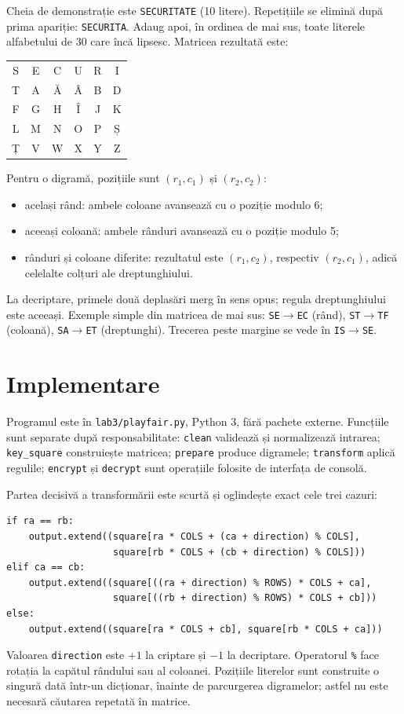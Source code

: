 \documentclass[12pt,a4paper]{article}
\newcommand{\file}[1]{\texttt{#1}}
\begin{document}
Cheia de demonstrație este \texttt{SECURITATE} (10 litere). Repetițiile se elimină
după prima apariție: \texttt{SECURITA}. Adaug apoi, în ordinea de mai sus, toate
literele alfabetului de 30 care încă lipsesc. Matricea rezultată este:

\begin{center}
\renewcommand{\arraystretch}{1.3}
\begin{tabular}{cccccc}
\toprule
S&E&C&U&R&I\\
T&A&Ă&Â&B&D\\
F&G&H&Î&J&K\\
L&M&N&O&P&Ș\\
Ț&V&W&X&Y&Z\\
\bottomrule
\end{tabular}
\end{center}

Pentru o digramă, pozițiile sunt $(r_1,c_1)$ și $(r_2,c_2)$:
\begin{itemize}
\item același rând: ambele coloane avansează cu o poziție modulo 6;
\item aceeași coloană: ambele rânduri avansează cu o poziție modulo 5;
\item rânduri și coloane diferite: rezultatul este $(r_1,c_2)$, respectiv
  $(r_2,c_1)$, adică celelalte colțuri ale dreptunghiului.
\end{itemize}
La decriptare, primele două deplasări merg în sens opus; regula dreptunghiului
este aceeași. Exemple simple din matricea de mai sus: \texttt{SE}$\to$\texttt{EC}
(rând), \texttt{ST}$\to$\texttt{TF} (coloană), \texttt{SA}$\to$\texttt{ET}
(dreptunghi). Trecerea peste margine se vede în \texttt{IS}$\to$\texttt{SE}.

\section{Implementare}

Programul este în \file{lab3/playfair.py}, Python 3, fără pachete externe.
Funcțiile sunt separate după responsabilitate: \file{clean} validează și
normalizează intrarea; \file{key\_square} construiește matricea;
\file{prepare} produce digramele; \file{transform} aplică regulile;
\file{encrypt} și \file{decrypt} sunt operațiile folosite de interfața de consolă.

Partea decisivă a transformării este scurtă și oglindește exact cele trei cazuri:
\begin{lstlisting}
if ra == rb:
    output.extend((square[ra * COLS + (ca + direction) % COLS],
                   square[rb * COLS + (cb + direction) % COLS]))
elif ca == cb:
    output.extend((square[((ra + direction) % ROWS) * COLS + ca],
                   square[((rb + direction) % ROWS) * COLS + cb]))
else:
    output.extend((square[ra * COLS + cb], square[rb * COLS + ca]))
\end{lstlisting}
Valoarea \file{direction} este $+1$ la criptare și $-1$ la decriptare. Operatorul
\file{\%} face rotația la capătul rândului sau al coloanei. Pozițiile literelor
sunt construite o singură dată într-un dicționar, înainte de parcurgerea
digramelor; astfel nu este necesară căutarea repetată în matrice.
\end{document}
